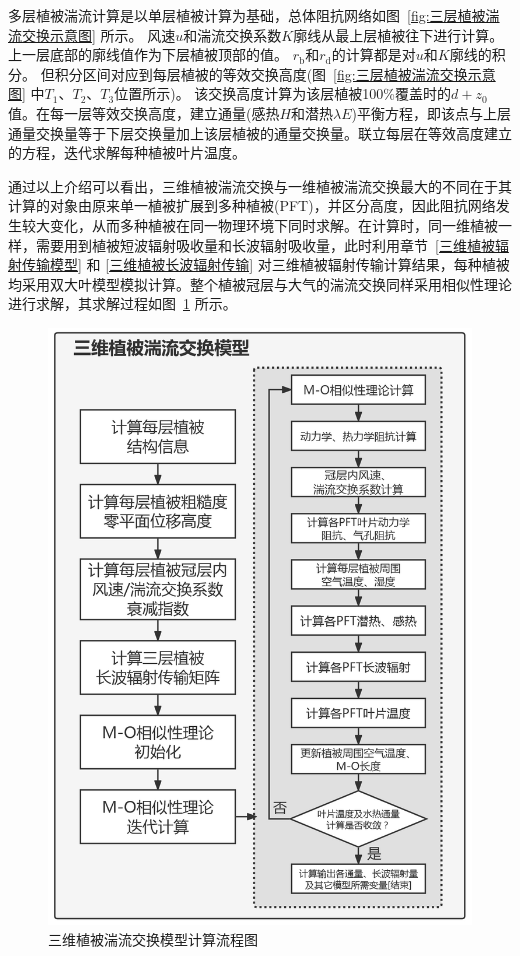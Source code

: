 多层植被湍流计算是以单层植被计算为基础，总体阻抗网络如图~\ref{fig:三层植被湍流交换示意图} 所示。
风速$u$和湍流交换系数$K$廓线从最上层植被往下进行计算。上一层底部的廓线值作为下层植被顶部的值。
$r_{\mathrm {b}}$和$r_{\mathrm {d}}$的计算都是对$u$和$K$廓线的积分。
但积分区间对应到每层植被的等效交换高度(图~\ref{fig:三层植被湍流交换示意图} 中$T_{1}$、$T_{2}$、$T_{3}$位置所示)。
该交换高度计算为该层植被100\%覆盖时的$d+z_0$值。在每一层等效交换高度，建立通量(感热$H$和潜热$\lambda E$)平衡方程，即该点与上层通量交换量等于下层交换量加上该层植被的通量交换量。联立每层在等效高度建立的方程，迭代求解每种植被叶片温度。

通过以上介绍可以看出，三维植被湍流交换与一维植被湍流交换最大的不同在于其计算的对象由原来单一植被扩展到多种植被(PFT)，并区分高度，因此阻抗网络发生较大变化，从而多种植被在同一物理环境下同时求解。在计算时，同一维植被一样，需要用到植被短波辐射吸收量和长波辐射吸收量，此时利用章节~\ref{三维植被辐射传输模型} 和 \ref{三维植被长波辐射传输} 对三维植被辐射传输计算结果，每种植被均采用双大叶模型模拟计算。整个植被冠层与大气的湍流交换同样采用相似性理论进行求解，其求解过程如图~\ref{fig:三维植被湍流交换模型计算流程图} 所示。
{
  \begin{figure}[htbp]
    \centering
    \includegraphics[width=0.75\linewidth]{Figures/地表湍流交换过程/三维植被湍流交换模型计算流程图_v2.png}
    \caption{三维植被湍流交换模型计算流程图}
    \label{fig:三维植被湍流交换模型计算流程图}
  \end{figure}
}


